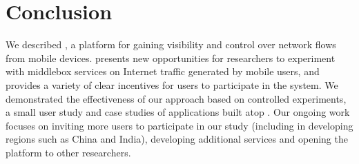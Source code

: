 \section{Conclusion}
\label{sec:conclusion}
We described \meddle, a platform for gaining visibility and control over 
network flows from mobile devices. \meddle presents new opportunities for researchers 
to experiment with middlebox services on Internet traffic generated by mobile users, and 
provides a variety of clear incentives for users to participate in the system. We demonstrated 
the effectiveness of our approach based on controlled experiments, a small user study and 
case studies of applications built atop \meddle. Our ongoing work focuses on inviting more 
users to participate in our study (including in developing regions such as China and India), 
developing additional \meddlebox services and opening 
the platform to other researchers. 

